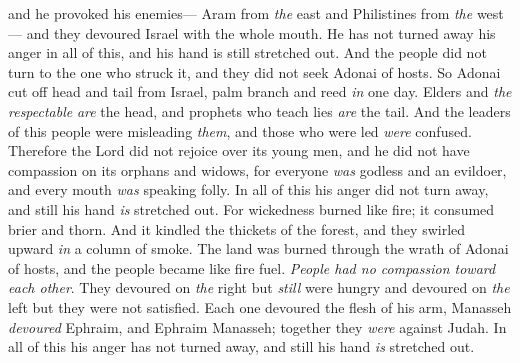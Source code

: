 \begin{biblechapter}
and he provoked his enemies—
\verse Aram from \textit{the} east 
and Philistines from \textit{the} west— 
and they devoured Israel with the whole mouth. 
He has not turned away his anger in all of this, 
and his hand is still stretched out.
\verse And the people did not turn to the one who struck it, 
and they did not seek Adonai of hosts.
\verse So Adonai cut off head and tail from Israel, 
palm branch and reed \textit{in} one day.
\verse Elders and \textit{the respectable} \textit{are} the head, 
and prophets who teach lies \textit{are} the tail.
\verse And the leaders of this people were misleading \textit{them}, 
and those who were led \textit{were} confused.
\verse Therefore the Lord did not rejoice over its young men, 
and he did not have compassion on its orphans and widows, 
for everyone \textit{was} godless and an evildoer, 
and every mouth \textit{was} speaking folly. 
In all of this his anger did not turn away, 
and still his hand \textit{is} stretched out.
\verse For wickedness burned like fire; 
it consumed brier and thorn. 
And it kindled the thickets of the forest, 
and they swirled upward \textit{in} a column of smoke.
\verse The land was burned through the wrath of Adonai of hosts, 
and the people became like fire fuel. 
\textit{People had no compassion toward each other}.
\verse They devoured on \textit{the} right but \textit{still} were hungry 
and devoured on \textit{the} left but they were not satisfied. 
Each one devoured the flesh of his arm,
\verse Manasseh \textit{devoured} Ephraim, and Ephraim Manasseh; 
together they \textit{were} against Judah. 
In all of this his anger has not turned away, 
and still his hand \textit{is} stretched out.
\end{biblechapter}

